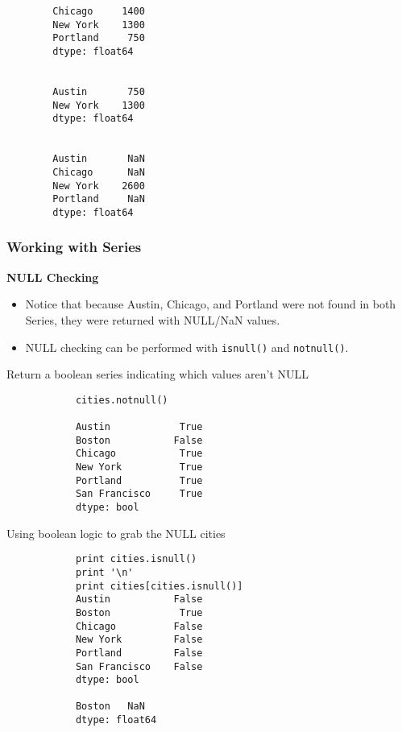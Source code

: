 \documentclass[MASTER.tex]{subfiles}
\begin{document}
			\begin{frame}[fragile]
				\begin{verbatim}
		Chicago     1400
		New York    1300
		Portland     750
		dtype: float64
		
		
		Austin       750
		New York    1300
		dtype: float64
		
		
		Austin       NaN
		Chicago      NaN
		New York    2600
		Portland     NaN
		dtype: float64
		\end{verbatim}
	\end{frame}
	\begin{frame}[fragile]
	\frametitle{Working with Series}
	\textbf{NULL Checking}
	\begin{itemize}

\item Notice that because Austin, Chicago, and Portland were not found in both Series, they were returned with NULL/NaN values.

\item NULL checking can be performed with \texttt{isnull()} and \texttt{notnull()}.
	\end{itemize}		
	\end{frame}
	\begin{frame}[fragile]
		Return a boolean series indicating which values aren't NULL
		
		\begin{framed}
			\begin{verbatim}
			cities.notnull()

			Austin            True
			Boston           False
			Chicago           True
			New York          True
			Portland          True
			San Francisco     True
			dtype: bool
			\end{verbatim}
		\end{framed}
\end{frame}
		\begin{frame}[fragile]
Using boolean logic to grab the NULL cities
		\begin{framed}
		\begin{verbatim}
			print cities.isnull()
			print '\n'
			print cities[cities.isnull()]
			Austin           False
			Boston            True
			Chicago          False
			New York         False
			Portland         False
			San Francisco    False
			dtype: bool
						
			Boston   NaN
			dtype: float64
			\end{verbatim}
		\end{framed}
	\end{frame}
\end{document}
